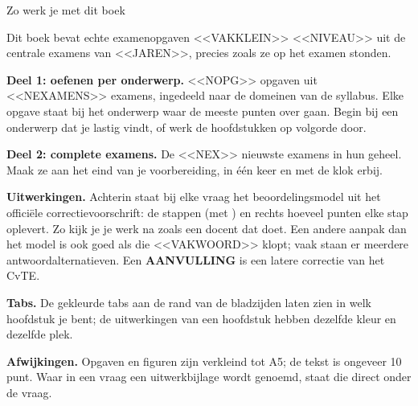 \documentclass[11pt,twoside]{book}
\begin{document}
\renewcommand\kopL{Voorwerk}\renewcommand\kopR{Zo werk je met dit boek}
\label{uitleg}
{\sffamily\zwart\fontsize{17}{20}\selectfont Zo werk je met dit boek}\par\vskip 6pt
{\opmaakproza\small
Dit boek bevat echte examenopgaven <<VAKKLEIN>> <<NIVEAU>> uit de centrale examens van <<JAREN>>,
precies zoals ze op het examen stonden.

\textbf{Deel 1: oefenen per onderwerp.} <<NOPG>> opgaven uit <<NEXAMENS>> examens, ingedeeld naar de domeinen van de
syllabus. Elke opgave staat bij het onderwerp waar de meeste punten over gaan. Begin bij een onderwerp dat je
lastig vindt, of werk de hoofdstukken op volgorde door.

\textbf{Deel 2: complete examens.} De <<NEX>> nieuwste examens in hun geheel. Maak ze aan het eind van je voorbereiding,
in \'e\'en keer en met de klok erbij.

\textbf{Uitwerkingen.} Achterin staat bij elke vraag het beoordelingsmodel uit het offici\"ele correctievoorschrift:
de stappen (met \textbullet) en rechts hoeveel punten elke stap oplevert. Zo kijk je je werk na zoals een docent dat doet.
Een andere aanpak dan het model is ook goed als die <<VAKWOORD>> klopt; vaak staan er meerdere antwoordalternatieven.
Een \textcolor{kleur2}{\sffamily\scriptsize\bfseries AANVULLING} is een latere correctie van het CvTE.


\textbf{Tabs.} De gekleurde tabs aan de rand van de bladzijden laten zien in welk hoofdstuk je bent; de uitwerkingen
van een hoofdstuk hebben dezelfde kleur en dezelfde plek.

\textbf{Afwijkingen.} Opgaven en figuren zijn verkleind tot A5; de tekst is ongeveer 10 punt.
Waar in een vraag een uitwerkbijlage wordt genoemd, staat die direct onder de vraag.\par}
\clearpage
\end{document}
